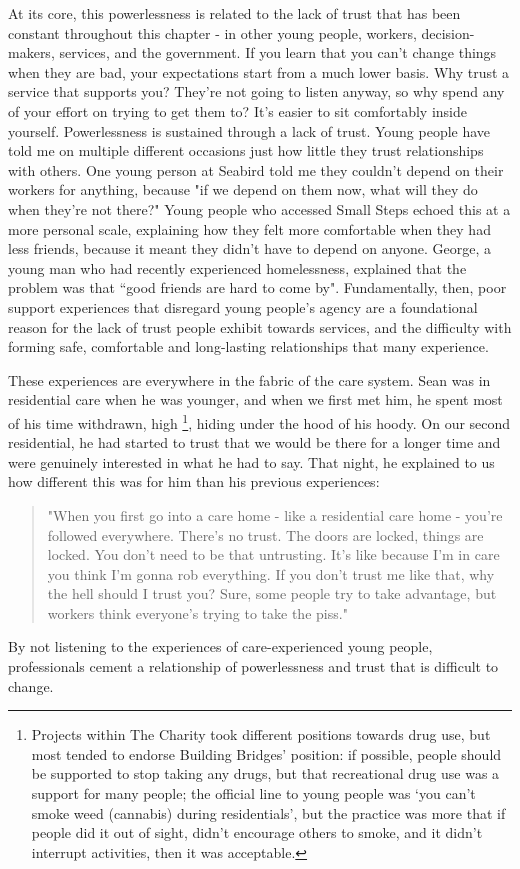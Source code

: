 At its core, this powerlessness is related to the lack of trust that has been constant throughout this chapter - in other young people, workers, decision-makers, services, and the government. If you learn that you can't change things when they are bad, your expectations start from a much lower basis. Why trust a service that supports you? They're not going to listen anyway, so why spend any of your effort on trying to get them to? It's easier to sit comfortably inside yourself. Powerlessness is sustained through a lack of trust. Young people  have told me on multiple different occasions just how little they trust relationships with others. One young person at Seabird told me they couldn't depend on their workers for anything, because "if we depend on them now, what will they do when they're not there?" Young people who accessed Small Steps echoed this at a more personal scale, explaining how they felt more comfortable when they had less friends, because it meant they didn't have to depend on anyone. George, a young man who had recently experienced homelessness, explained that the problem was that “good friends are hard to come by". Fundamentally, then, poor support experiences that disregard young people’s agency are a foundational reason for the lack of trust people exhibit towards services, and the difficulty with forming safe, comfortable and long-lasting relationships that many experience. 

These experiences are everywhere in the fabric of the care system. Sean was in residential care when he was younger, and when we first met him, he spent most of his time withdrawn, high \footnote{Projects within The Charity took different positions towards drug use, but most tended to endorse Building Bridges’ position: if possible, people should be supported to stop taking any drugs, but that recreational drug use was a support for many people; the official line to young people was ‘you can’t smoke weed (cannabis) during residentials’, but the practice was more that if people did it out of sight, didn’t encourage others to smoke, and it didn’t interrupt activities, then it was acceptable.},  hiding under the hood of his hoody. On our second residential, he had started to trust that we would be there for a longer time and were genuinely interested in what he had to say. That night, he explained to us how different this was for him than his previous experiences:
\begin{quote}
"When you first go into a care home - like a residential care home - you're followed everywhere. There's no trust. The doors are locked, things are locked. You don't need to be that untrusting. It's like because I'm in care you think I'm gonna rob everything. If you don't trust me like that, why the hell should I trust you? Sure, some people try to take advantage, but workers think everyone's trying to take the piss."
\end{quote}
By not listening to the experiences of care-experienced young people, professionals cement a relationship of powerlessness and trust that is difficult to change.

